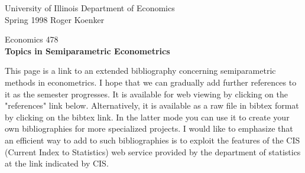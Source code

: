 \documentclass{amsart}
\begin{document}



\noindent
University of Illinois \hfill Department of Economics \\
Spring 1998 \hfill Roger Koenker
\begin{center}
\large{
{ Economics 478 \\
{\bf Topics in Semiparametric Econometrics}}}
\end{center}

This page is a link to an extended bibliography concerning semiparametric
methods in econometrics.  I hope that we can gradually add further
references to it as the semester progresses.  It is available for web
viewing by clicking on the "references" link below.  Alternatively,
it is available as a raw file in bibtex format by clicking 
on the bibtex link.  In the latter mode you can use it to create
your own bibliographies for more specialized projects.  I would like
to emphasize that an efficient way to add to such bibliographies
is to exploit the features of the CIS (Current Index to Statistics)
web service provided by the department of statistics at the link
indicated by CIS.
\nocite{PK.1997}
\nocite{K.1997}
\nocite{P.1997}
\nocite{F.1997}
\nocite{RH:97}
\nocite{HP:97}
\nocite{jww:88}
\nocite{G:1997}
\nocite{H:1997}
\nocite{air:1996}
\nocite{Z:1997}
\nocite{FG:1996}
\nocite{GT:1997}
\nocite{marr:wand:1992}
\nocite{manski:1997}
\nocite{ai:1994}
\nocite{heckman:1996}
\nocite{aai:1997}
\nocite{Twins}
\nocite{rock:1983}
\nocite{amma.93}
\nocite{han:1987}
\nocite{kk:1997}
\nocite{rupp:1985}
\nocite{gj:1992}
\nocite{gjkp:1993}
\nocite{newe:powe:1990}
\nocite{powe:1986}
\nocite{oja:niin:1985}
\nocite{niin:oja:tabl:1990}
\nocite{niin:oja:1995}
\nocite{mans:1975}
\nocite{mans:1985}
\nocite{mt:86}
\nocite{hols:1985}
\nocite{hols:1987}
\nocite{hast:stue:1989}
\nocite{engl:hols:rupp:1988}
\nocite{k:1994}
\nocite{Small}
\nocite{King}
\nocite{Stoker}
\nocite{RS}
\nocite{P:83}
\nocite{amem:82}
\nocite{koen:port:1987}
\nocite{port:1991}
\nocite{poll:1991}
\nocite{phil:1991}
\nocite{weis:1991}
\nocite{babu:1989}
\nocite{arcones:1996}
\nocite{bass:koen:1978}
\nocite{hono:powe:1994}
\nocite{chau:1991}
\nocite{kolt}
\nocite{cds:1997}
\nocite{BSiM}
\nocite{BR.74}
\nocite{BC.80}
\nocite{Bed.96}
\nocite{BYW}
\nocite{B.94}
\nocite{mark:horo:1995}
\nocite{horo}
\nocite{horo:97}
\nocite{Hahn}
\nocite{Bu.95}
\nocite{Bu.96}
\nocite{Ch.94}
\nocite{Chak}
\nocite{CC}
\nocite{Chd.96}
\nocite{Lamp:1994}
\nocite{VR:1997}
\nocite{Chd.92}
\nocite{CDS}
\nocite{cds:1994}
\nocite{Chay}
\nocite{Cox.72}
\nocite{CsR.84}
\nocite{Ef.91a}
\end{document}
